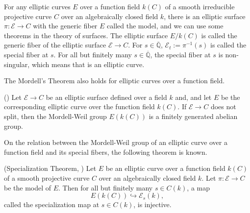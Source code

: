 \documentclass[main]{subfiles}
\begin{document}
For any elliptic curves $E$ over a function field $k(C)$ of a smooth irreducible projective curve $C$ over an algebraically closed field $k$, there is an elliptic surface $\pi: \mathcal{E} \to C$ with the generic fiber $E$ called the \Neron{} model, and we can use some theorems in the theory of surfaces.
The elliptic surface $E/k(C)$ is called the generic fiber of the elliptic surface $\mathcal{E} \to C$.
For $s \in \overline{\mathbb{Q}}$, $\mathcal{E}_t:=\pi^{-1}(s)$ is called the special fiber at $s$.
For all but finitely many $s \in \overline{\mathbb{Q}}$, the special fiber at $s$ is non-singular, which means that is an elliptic curve.

The Mordell's Theorem also holds for elliptic curves over a function field.
\begin{thm}{(\cite[Theorem 6.1.]{ref:advancedaec})}
    \label{thm:mordell_function_field}
    Let $\mathcal{E} \to C$ be an elliptic surface defined over a field $k$ and, and let $E$ be the corresponding elliptic curve over the function field $k(C)$.
    If $\mathcal{E}\to C$ does not split, then the Mordell-Weil group $E(k(C))$ is a finitely generated abelian group.
\end{thm}

On the relation between the Mordell-Weil group of an elliptic curve over a function field and its special fibers, the following theorem is known.
\begin{thm}{(Specialization Theorem, \cite[Theorem 11.4.]{ref:advancedaec})}
    \label{thm:specialization}
    Let $E$ be an elliptic curve over a function field $k(C)$ of a smooth projective curve $C$ over an algebraically closed field $k$.
    Let $\pi: \mathcal{E} \to C$ be the \Neron{} model of $E$.
    Then for all but finitely many $s \in C(k)$, a map
    \begin{equation*}
        E(k(C)) \hookrightarrow \mathcal{E}_{s}(k),
    \end{equation*}
    called the specialization map at $s \in C(k)$, is injective.
\end{thm}
\end{document}
